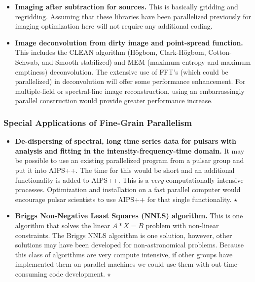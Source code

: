\begin{itemize}

\item {\bf Imaging after subtraction for sources.}  This is basically
gridding and regridding.  Assuming that these libraries have been
parallelized previously for imaging optimization here will not require
any additional coding.

\item {\bf Image deconvolution from dirty image and point-spread
function.}  This includes the CLEAN algorithm (H\"ogbom,
Clark-H\"ogbom, Cotton-Schwab, and Smooth-stabilized) and MEM (maximum
entropy and maximum emptiness) deconvolution.  The extensive use of
FFT's (which could be parallelized) in deconvolution will offer some
performance enhancement.  For multiple-field or spectral-line image
reconstruction, using an embarrassingly parallel construction would
provide greater performance increase.

\end{itemize}

\subsubsection{Special Applications of Fine-Grain Parallelism}

\begin{itemize}

\item {\bf De-dispersing of spectral, long time series data for
pulsars with analysis and fitting in the intensity-frequency-time
domain.}  It may be possible to use an existing parallelized program
from a pulsar group and put it into AIPS++.  The time for this would
be short and an additional functionality is added to AIPS++.  This is
a {\it very} computationally-intensive processes.  Optimization and
installation on a fast parallel computer would encourage pulsar
scientists to use AIPS++ for that single functionality. $\star$

\item {\bf Briggs Non-Negative Least Squares (NNLS) algorithm.}  This
is one algorithm that solves the linear $A * X = B$ problem with
non-linear constraints.  The Briggs NNLS algorithm is one solution,
however, other solutions may have been developed for non-astronomical
problems.  Because this class of algorithms are very compute
intensive, if other groups have implemented them on parallel machines
we could use them with out time-consuming code development. $\star$

\end{itemize}

